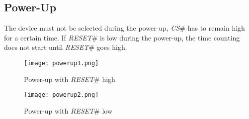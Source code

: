 \documentclass[10pt, english, a4paper, titlepage, oneside]{book}
\begin{document}
\subsection{Power-Up}
\vspace{2mm}
The device must not be selected during the power-up, \textit{CS}\# has to remain high for a certain time. If \textit{RESET}\# is low during the power-up, the time counting does not start until \textit{RESET}\# goes high.
\vspace{4mm}
\begin{figure}[H]
    \centering
    \texttt{[image: powerup1.png]}
    \vspace{3mm}
    \caption{Power-up with \textit{RESET}\# high}
    \label{powerup1}
\end{figure}
\vspace{2mm}
\begin{figure}[H]
    \centering
    \texttt{[image: powerup2.png]}
    \vspace{3mm}
    \caption{Power-up with \textit{RESET}\# low}
    \label{powerup2}
\end{figure}
\end{document}
